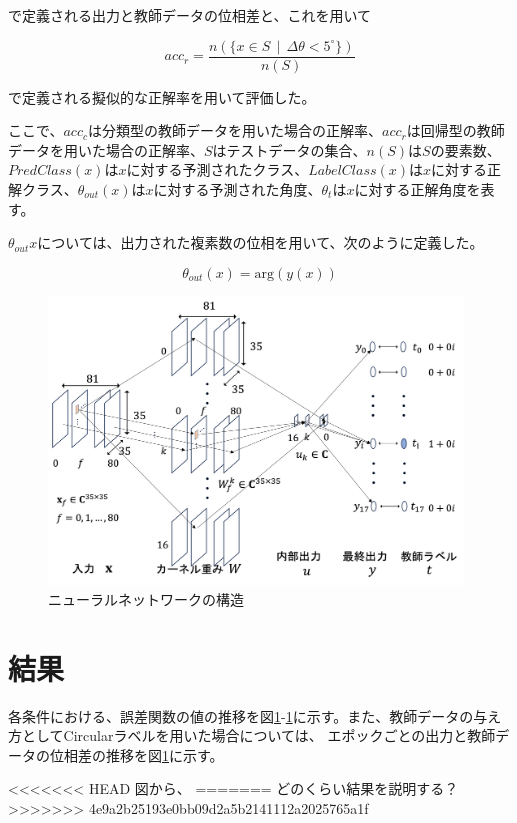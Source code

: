 \documentclass[11pt,a4paper,uplatex]{ujarticle}
\begin{document}
  で定義される出力と教師データの位相差と、これを用いて

  \begin{equation}
    acc_{r} = \frac{n(\{x \in S \, \mid\, \Delta\theta < 5^{\circ}\})}{n(S)}
  \end{equation} %

  で定義される擬似的な正解率を用いて評価した。

  ここで、$acc_c$は分類型の教師データを用いた場合の正解率、$acc_r$は回帰型の教師データを用いた場合の正解率、$S$はテストデータの集合、$n(S)$は$S$の要素数、
  $PredClass(x)$は$x$に対する予測されたクラス、$LabelClass(x)$は$x$に対する正解クラス、$\theta_{out}(x)$は$x$に対する予測された角度、$\theta_{t}$は$x$に対する正解角度を表す。

  $\theta_{out}{x}$については、出力された複素数の位相を用いて、次のように定義した。

  \begin{equation}
    \theta_{out}(x) = \mathrm{arg}(y(x))
  \end{equation} %

  \begin{figure}[hbtp]
    \centering
    \includegraphics[keepaspectratio, width=110mm]{Images/network.png}
    \caption{ニューラルネットワークの構造}
    \label{fig:neuralnet}
  \end{figure}
  

\section{結果}
  各条件における、誤差関数の値の推移を図\ref{}-\ref{}に示す。また、教師データの与え方としてCircularラベルを用いた場合については、
  エポックごとの出力と教師データの位相差の推移を図\ref{}に示す。

<<<<<<< HEAD
  図から、
=======
  どのくらい結果を説明する？
>>>>>>> 4e9a2b25193e0bb09d2a5b2141112a2025765a1f
\end{document}
